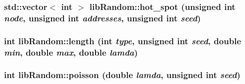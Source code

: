 \hypertarget{namespacelibRandom_1e1da172d345c4aeb116147d70273bab}{
\subsubsection[{hot\_\-spot}]{\setlength{\rightskip}{0pt plus 5cm}std::vector$<$ int $>$ libRandom::hot\_\-spot (unsigned int {\em node}, \/  unsigned int {\em addresses}, \/  unsigned int {\em seed})}}
\label{namespacelibRandom_1e1da172d345c4aeb116147d70273bab}


\hypertarget{namespacelibRandom_74cde0683301c167495fe532c61019c4}{
\subsubsection[{length}]{\setlength{\rightskip}{0pt plus 5cm}int libRandom::length (int {\em type}, \/  unsigned int {\em seed}, \/  double {\em min}, \/  double {\em max}, \/  double {\em lamda})}}
\label{namespacelibRandom_74cde0683301c167495fe532c61019c4}


\hypertarget{namespacelibRandom_92b1a45f88ea941a0c13e4d0cf2e2ddf}{
\subsubsection[{poisson}]{\setlength{\rightskip}{0pt plus 5cm}int libRandom::poisson (double {\em lamda}, \/  unsigned int {\em seed})}}
\label{namespacelibRandom_92b1a45f88ea941a0c13e4d0cf2e2ddf}


